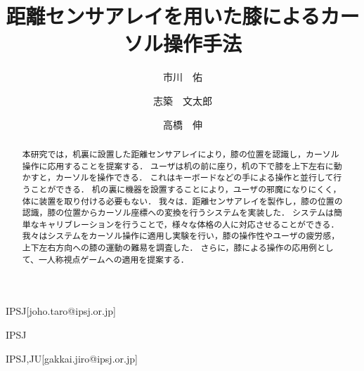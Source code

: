 \documentclass[submit, techrep]{ipsj}
\begin{document}
\title{距離センサアレイを用いた膝によるカーソル操作手法}






\author{市川　佑}{}{IPSJ}[joho.taro@ipsj.or.jp]
\author{志築　文太郎}{}{IPSJ}
\author{高橋　伸}{}{IPSJ,JU}[gakkai.jiro@ipsj.or.jp]

\begin{abstract}
本研究では，机裏に設置した距離センサアレイにより，膝の位置を認識し，カーソル操作に応用することを提案する．
ユーザは机の前に座り，机の下で膝を上下左右に動かすと，カーソルを操作できる．
これはキーボードなどの手による操作と並行して行うことができる．
机の裏に機器を設置することにより，ユーザの邪魔になりにくく，体に装置を取り付ける必要もない．
我々は．距離センサアレイを製作し，膝の位置の認識，膝の位置からカーソル座標への変換を行うシステムを実装した．
システムは簡単なキャリブレーションを行うことで，様々な体格の人に対応させることができる．
我々はシステムをカーソル操作に適用し実験を行い，膝の操作性やユーザの疲労感，上下左右方向への膝の運動の難易を調査した．
さらに，膝による操作の応用例として、一人称視点ゲームへの適用を提案する．
\end{abstract}






\maketitle

\end{document}
